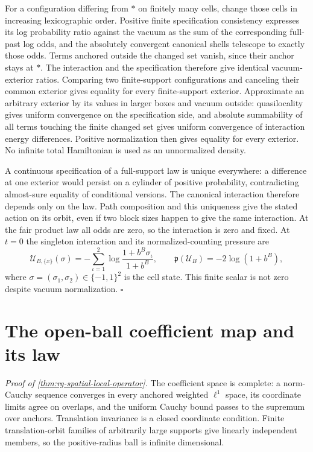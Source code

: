 For a configuration differing from \(*\) on finitely many cells, change
those cells in increasing lexicographic order. Positive finite
specification consistency expresses its log probability ratio against the
vacuum as the sum of the corresponding full-past log odds, and the
absolutely convergent canonical shells telescope to exactly those odds.
Terms anchored outside the changed set vanish, since their anchor stays at
\(*\). The interaction and the specification therefore give identical
vacuum-exterior ratios. Comparing two finite-support configurations and
canceling their common exterior gives equality for every finite-support
exterior. Approximate an arbitrary exterior by its values in larger boxes
and vacuum outside: quasilocality gives uniform convergence on the
specification side, and absolute summability of all terms touching the
finite changed set gives uniform convergence of interaction energy
differences. Positive normalization then gives equality for every exterior.
No infinite total Hamiltonian is used as an unnormalized density.

A continuous specification of a full-support law is unique everywhere: a
difference at one exterior would persist on a cylinder of positive
probability, contradicting almost-sure equality of conditional versions.
The canonical interaction therefore depends only on the law. Path
composition and this uniqueness give the stated action on its orbit, even
if two block sizes happen to give the same interaction. At the fair product
law all odds are zero, so the interaction is zero and fixed. At \(t=0\) the
singleton interaction and its normalized-counting pressure are
\begin{equation}
 \mathscr U_{B,\{x\}}(\sigma)=-\sum_{\iota=1}^2
       \log\frac{1+b^B\sigma_\iota}{1+b^B},\qquad
 \mathfrak p(\mathscr U_B)=-2\log(1+b^B),
 \label{eq:rg-spatial-proof-product-vacuum-scalar}
\end{equation}
where \(\sigma=(\sigma_1,\sigma_2)\in\{-1,1\}^2\) is the cell state. This finite scalar is
not zero despite vacuum normalization. \hfill\(\square\)

\section{The open-ball coefficient map and its law}
\label{sec:rg-spatial-proof-operator}

\noindent\emph{Proof of \cref{thm:rg-spatial-local-operator}.}
The coefficient space is complete: a norm-Cauchy sequence converges in
every anchored weighted \(\ell^1\) space, its coordinate limits agree on
overlaps, and the uniform Cauchy bound passes to the supremum over anchors.
Translation invariance is a closed coordinate condition. Finite
translation-orbit families of arbitrarily large supports give linearly
independent members, so the positive-radius ball is infinite dimensional.

